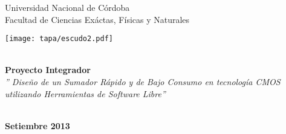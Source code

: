 \begin{titlepage}
\pagestyle{empty}       

\begin{center}
	\Huge{Universidad Nacional de Córdoba\\}
	\Large {Facultad de Ciencias Exáctas, Físicas y Naturales}\\

\vspace{1cm}

\texttt{[image: tapa/escudo2.pdf]}


\vspace{1cm}


	\Huge \textbf{\\[2ex]Proyecto Integrador}
	\Large \textsl{\\[2ex] '' Diseño de un Sumador Rápido y de Bajo Consumo en tecnología CMOS utilizando Herramientas de Software Libre''}

	\begin{normalsize}
	\end{normalsize}
	\begin{large}	
		\\ \textbf{Setiembre 2013}
	\end{large}

\end{center}

\vspace{0.5cm}

\begin{center}



\end{center}

\hfuzz=50pt
\end{titlepage}
